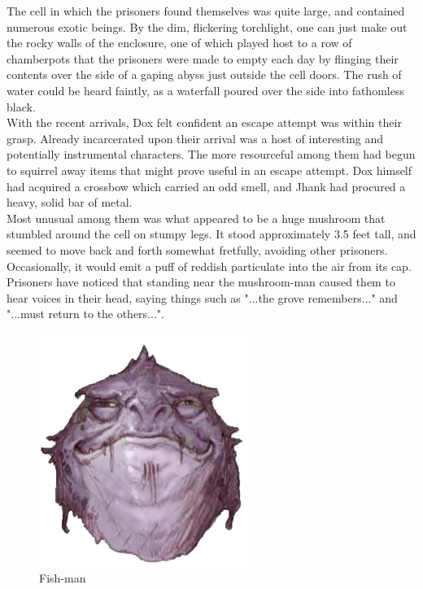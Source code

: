 \documentclass[letterpaper,10pt,twoside,twocolumn,openany]{book}
\begin{document}
The cell in which the prisoners found themselves was quite large, and contained numerous exotic beings. By the dim, flickering torchlight, one can just make out the rocky walls of the enclosure, one of which played host to a row of chamberpots that the prisoners were made to empty each day by flinging their contents over the side of a gaping abyss just outside the cell doors. The rush of water could be heard faintly, as a waterfall poured over the side into fathomless black.\\

With the recent arrivals, Dox felt confident an escape attempt was within their grasp. Already incarcerated upon their arrival was a host of interesting and potentially instrumental characters. The more resourceful among them had begun to squirrel away items that might prove useful in an escape attempt. Dox himself had acquired a crossbow which carried an odd smell, and Jhank had procured a heavy, solid bar of metal.\\

Most unusual among them was what appeared to be a huge mushroom that stumbled around the cell on stumpy legs. It stood approximately 3.5 feet tall, and seemed to move back and forth somewhat fretfully, avoiding other prisoners. Occasionally, it would emit a puff of reddish particulate into the air from its cap. Prisoners have noticed that standing near the mushroom-man caused them to hear voices in their head, saying things such as "...the grove remembers..." and "...must return to the others...".
\begin{figure}
	\centering
	\includegraphics[width=0.7\linewidth]{img/dist/fish_man.png}
	\caption{Fish-man\label{fig:fishman}}
\end{figure}
\end{document}

